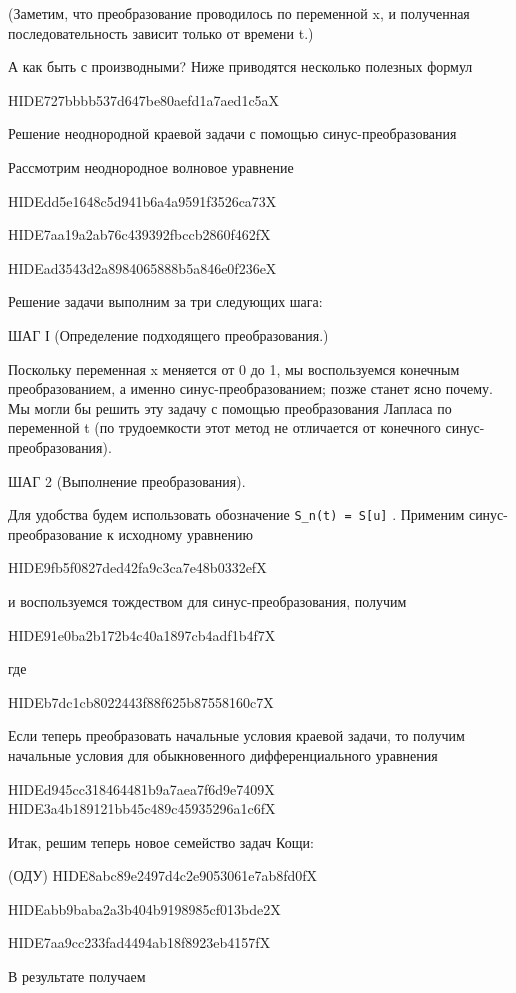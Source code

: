 \documentclass[
  ukrainian,
]{article}
\begin{document}
(Заметим, что преобразование проводилось по переменной x, и полученная
последовательность зависит только от времени t.)

А как быть с производными? Ниже приводятся несколько полезных формул

HIDE727bbbb537d647be80aefd1a7aed1c5aX

Решение неоднородной краевой задачи с помощью синус-преобразования

Рассмотрим неоднородное волновое уравнение

HIDEdd5e1648c5d941b6a4a9591f3526ca73X

HIDE7aa19a2ab76c439392fbccb2860f462fX

HIDEad3543d2a8984065888b5a846e0f236eX

Решение задачи выполним за три следующих шага:

ШАГ І (Определение подходящего преобразования.)

Поскольку переменная x меняется от 0 до 1, мы воспользуемся конечным
преобразованием, а именно синус-преобразованием; позже станет ясно
почему. Мы могли бы решить эту задачу с помощью преобразования Лапласа
по переменной t (по трудоемкости этот метод не отличается от конечного
синус-преобразования).

ШАГ 2 (Выполнение преобразования).

Для удобства будем использовать обозначение
\texttt{S\_n(t)\ =\ S{[}u{]}} . Применим синус-преобразование к
исходному уравнению

HIDE9fb5f0827ded42fa9c3ca7e48b0332efX

и воспользуемся тождеством для синус-преобразования, получим

HIDE91e0ba2b172b4c40a1897cb4adf1b4f7X

где

HIDEb7dc1cb8022443f88f625b87558160c7X

Если теперь преобразовать начальные условия краевой задачи, то получим
начальные условия для обыкновенного дифференциального уравнения

HIDEd945cc318464481b9a7aea7f6d9e7409X
HIDE3a4b189121bb45c489c45935296a1c6fX

Итак, решим теперь новое семейство задач Кощи:

(ОДУ) HIDE8abc89e2497d4c2e9053061e7ab8fd0fX

HIDEabb9baba2a3b404b9198985cf013bde2X

HIDE7aa9cc233fad4494ab18f8923eb4157fX

В результате получаем
\end{document}
